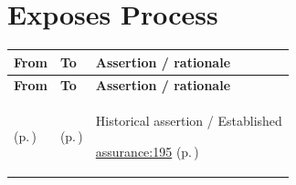 \section{Exposes Process}
\begingroup\small\setlength{\TableWidth}{\dimexpr\linewidth-6\tabcolsep-4\arrayrulewidth\relax}
\begin{longtable}{|>{\raggedright\arraybackslash}p{0.27\TableWidth}|>{\raggedright\arraybackslash}p{0.27\TableWidth}|>{\raggedright\arraybackslash}p{0.46\TableWidth}|}
\hline\rowcolor{TableHead}\textbf{From} & \textbf{To} & \textbf{Assertion / rationale}\\\hline\endfirsthead
\hline\rowcolor{TableHead}\textbf{From} & \textbf{To} & \textbf{Assertion / rationale}\\\hline\endhead
\hline\endfoot
\nameref{service:communicate-service-assurance-outcome} (p.\,\pageref{service:communicate-service-assurance-outcome}) & \nameref{process:assurance-process-reporting-communication} (p.\,\pageref{process:assurance-process-reporting-communication}) & Historical assertion / Established

 \hyperref[rad:assurance:191]{assurance:195} (p.\,\pageref{rad:assurance:191})\\\hline
\end{longtable}\endgroup
